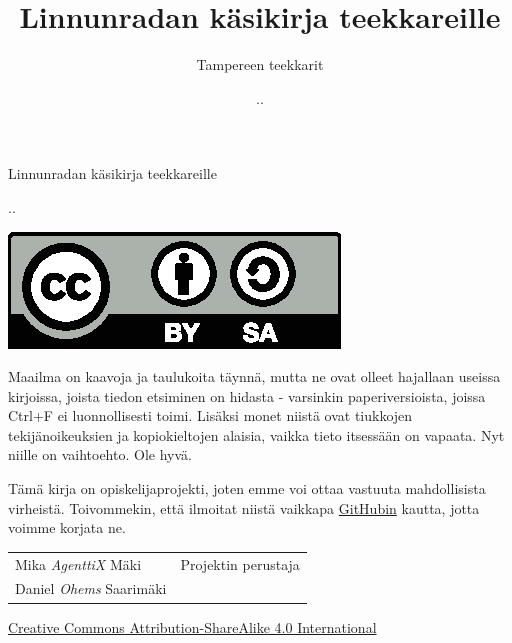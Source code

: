\documentclass[a4paper, finnish, 12pt, twoside]{article}
\title{Linnunradan käsikirja teekkareille}
\author{Tampereen teekkarit}
\date{\the\day.\the\month.\the\year}
\newcommand*\parttitle{}
\begin{document}
\begin{titlepage}
\centering
{\huge Linnunradan käsikirja teekkareille \par}
{\the\day.\the\month.\the\year \par}
\vfill
\includegraphics{by-sa.eps}
\end{titlepage}


Maailma on kaavoja ja taulukoita täynnä, mutta ne ovat olleet hajallaan useissa kirjoissa,
joista tiedon etsiminen on hidasta - varsinkin paperiversioista, joissa Ctrl+F ei luonnollisesti toimi.
Lisäksi monet niistä ovat tiukkojen tekijänoikeuksien ja kopiokieltojen alaisia,
vaikka tieto itsessään on vapaata. Nyt niille on vaihtoehto. Ole hyvä.

Tämä kirja on opiskelijaprojekti, joten emme voi ottaa vastuuta mahdollisista virheistä.
Toivommekin, että ilmoitat niistä vaikkapa \href{https://github.com/AgenttiX/compendium}{GitHubin} kautta, jotta voimme korjata ne.

\begin{table}[h!]
\centering
\begin{tabular}{ll}
Mika \textit{AgenttiX} Mäki		& Projektin perustaja \\
Daniel \textit{Ohems} Saarimäki \\
\end{tabular}
\end{table}

\vfill
{
	\centering
	\href{https://creativecommons.org/licenses/by-sa/4.0/}{Creative Commons Attribution-ShareAlike 4.0 International}
	\par
}

\pagebreak
\tableofcontents
\vfill %

\pagestyle{fancy}
\fancyhead{} 
\fancyhead[LO,RE]{\MakeUppercase{\textit{\parttitle}}} 
\fancyhead[RO,LE]{\nouppercase{\textit{\rightmark}}}
\fancyfoot{}
\fancyfoot[C]{\thepage}

\pagebreak
{} %





\pagebreak
\renewcommand{\headrulewidth}{0pt} 		%
\fancyhead{}							%
\setcounter{secnumdepth}{-1}			%
\end{document}
